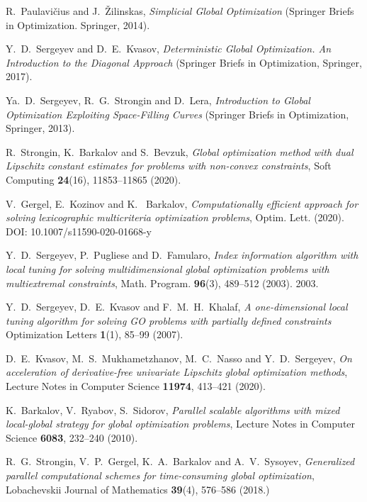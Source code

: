\documentclass[
11pt,%
tightenlines,%
twoside,%
onecolumn,%
nofloats,%
nobibnotes,%
nofootinbib,%
superscriptaddress,%
noshowpacs,%
centertags]%
{revtex4}
\begin{document}
\begin{thebibliography}{99}
R.~Paulavi\v{c}ius and J.~\v{Z}ilinskas, \textit{Simplicial Global Optimization} (Springer Briefs in Optimization. Springer, 2014).

Y.~D.~Sergeyev and D.~E.~Kvasov, \textit{Deterministic Global Optimization. An Introduction to the Diagonal Approach}  (Springer Briefs in Optimization, Springer, 2017).


	

Ya.~D.~Sergeyev, R.~G.~Strongin and D.~Lera, \textit{Introduction to Global Optimization Exploiting Space-Filling Curves} (Springer Briefs in Optimization, Springer, 2013).


R.~Strongin, K.~Barkalov and S.~Bevzuk, \textit{Global optimization method with dual Lipschitz constant estimates for problems with non-convex constraints}, Soft Computing \textbf{24}(16), 11853--11865 (2020).

V.~Gergel, E.~Kozinov and K.~ Barkalov, \textit{Computationally efficient approach for solving lexicographic multicriteria optimization problems}, Optim. Lett. (2020). DOI: 10.1007/s11590-020-01668-y 

Y.~D.~Sergeyev, P.~Pugliese and D.~Famularo, \textit{Index information algorithm with local tuning for solving multidimensional global optimization problems with multiextremal constraints}, Math. Program. \textbf{96}(3), 489--512 (2003).
2003.

Y.~D.~Sergeyev, D.~E.~Kvasov and F.~M.~H.~Khalaf, \textit{A one-dimensional local tuning algorithm for solving GO problems with partially defined constraints} Optimization Letters \textbf{1}(1), 85--99 (2007).

D.~E.~Kvasov, M.~S.~Mukhametzhanov, M.~C.~Nasso and Y.~D.~Sergeyev, \textit{On acceleration of derivative-free univariate Lipschitz global optimization methods}, Lecture Notes in Computer Science \textbf{11974}, 413--421 (2020).

K.~Barkalov, V.~Ryabov, S.~Sidorov, \textit{Parallel scalable algorithms with mixed local-global strategy for global optimization problems}, Lecture Notes in Computer Science \textbf{6083}, 232–240 (2010).
 
R.~G.~Strongin, V.~P.~Gergel, K.~A.~Barkalov and A.~V.~Sysoyev, \textit{Generalized parallel computational schemes for time-consuming global optimization}, Lobachevskii Journal of Mathematics \textbf{39}(4), 576--586 (2018.)


\end{thebibliography}
\end{document}
